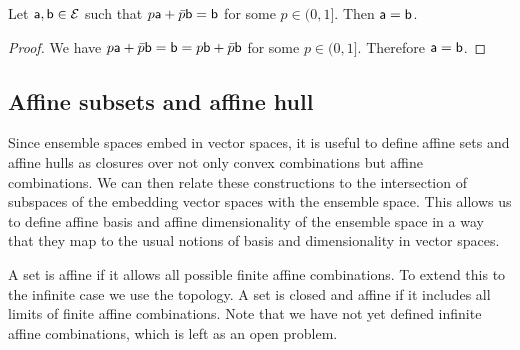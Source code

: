 \begin{mathSection}
	\begin{coro}
		Let $\ens[a], \ens[b] \in \Ens$ such that $p\ens[a] + \bar{p} \ens[b] = \ens[b]$ for some $p \in (0,1]$. Then $\ens[a] = \ens[b]$. 
	\end{coro}
	
	\begin{proof}
		We have $p\ens[a] + \bar{p} \ens[b] = \ens[b] = p\ens[b] + \bar{p} \ens[b]$ for some $p \in (0,1]$. Therefore $\ens[a] = \ens[b]$.
	\end{proof}
\end{mathSection}

\subsection{Affine subsets and affine hull}

Since ensemble spaces embed in vector spaces, it is useful to define affine sets and affine hulls as closures over not only convex combinations but affine combinations. We can then relate these constructions to the intersection of subspaces of the embedding vector spaces with the ensemble space. This allows us to define affine basis and affine dimensionality of the ensemble space in a way that they map to the usual notions of basis and dimensionality in vector spaces.

A set is affine if it allows all possible finite affine combinations. To extend this to the infinite case we use the topology. A set is closed and affine if it includes all limits of finite affine combinations. Note that we have not yet defined infinite affine combinations, which is left as an open problem.

